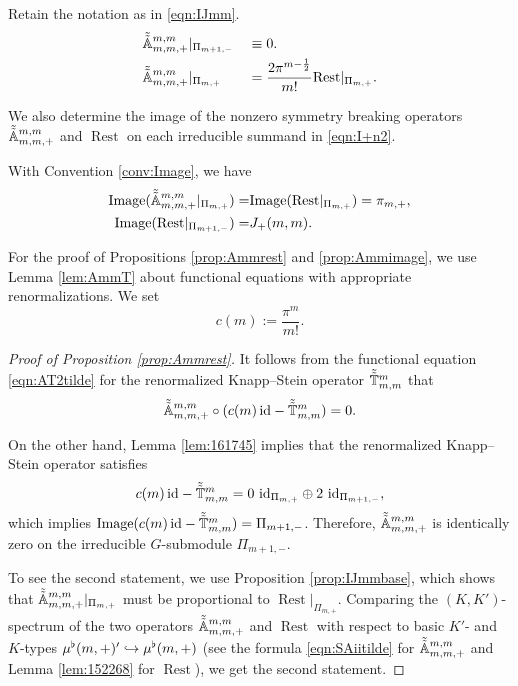 \begin{proposition}
\label{prop:Ammrest}
Retain the notation as in \eqref{eqn:IJmm}.  
\begin{alignat*}{2}
&\tilde{\tilde{{\mathbb{A}}}}_{{m},{m},{+}}^{{m, m}}
|_{\Pi_{m+1,-}}
&&
\equiv
0.  
\\
&\tilde{\tilde{{\mathbb{A}}}}_{{m},{m},{+}}^{{m, m}}
|_{\Pi_{m,+}}
&&=
\frac{2 \pi^{m-\frac{1}{2}}}{m!} {\operatorname{Rest}}|_{\Pi_{m,+}}.  
\end{alignat*}
\end{proposition}
We also determine
 the image of the nonzero symmetry breaking operators
 $\tilde{\tilde{{\mathbb{A}}}}_{{m},{m},{+}}^{{m,m}}$ and ${\operatorname{Rest}}$
 on each irreducible summand
in \eqref{eqn:I+n2}.  
\begin{proposition}
\label{prop:Ammimage}
With Convention \ref{conv:Image}, 
 we have 
\begin{align*}
{\operatorname{Image}}(\tilde{\tilde{{\mathbb{A}}}}_{{m},{m},{+}}^{{m, m}}
|_{\Pi_{m,+}})
=&
{\operatorname{Image}}
 ({\operatorname{Rest}}|_{\Pi_{m,+}})
=\pi_{m,+},   
\\
{\operatorname{Image}}
 ({\operatorname{Rest}}|_{\Pi_{m+1,-}})
=&
J_+(m, m).  
\end{align*}
\end{proposition}
For the proof of Propositions \ref{prop:Ammrest} and \ref{prop:Ammimage}, 
 we use Lemma \ref{lem:AmmT} about functional equations
 with appropriate renormalizations.  
We set 
\begin{equation}
\label{eqn:cm}
   c(m):=\frac{\pi^{m}}{m!}. 
\end{equation}
\begin{proof}
[Proof of Proposition \ref{prop:Ammrest}]
It follows from the functional equation \eqref{eqn:AT2tilde}
 for the 
renormalized Knapp--Stein operator
 $\tilde{\tilde{{\mathbb{T}}}}_{{m},{m}}^{{m}}$
 that 
\[
  \tilde{\tilde{{\mathbb{A}}}}_{{m},{m},{+}}^{{m, m}}
  \circ
  (c(m)\, {\operatorname{id}} - \tilde{\tilde{{\mathbb{T}}}}_{{m},{m}}^{{m}})=0.  
\]



On the other hand, 
 Lemma \ref{lem:161745} implies 
 that the renormalized Knapp--Stein operator satisfies 
\[
  c(m)\, {\operatorname{id}} - \tilde{\tilde{{\mathbb{T}}}}_{{m},{m}}^{{m}}
  =
  0\,\, {\operatorname{id}}_{\Pi_{m, +}} 
  \oplus
  2\,\, {\operatorname{id}}_{\Pi_{m+1, -}}, 
\]
which implies ${\operatorname{Image}}(c(m)\, {\operatorname{id}} - \tilde{\tilde{{\mathbb{T}}}}_{{m},{m}}^{{m}})=\Pi_{m+1, -}$.  
Therefore, 
 $\tilde{\tilde{{\mathbb{A}}}}_{{m},{m},{+}}^{{m, m}}$ is 
 identically zero
 on the irreducible $G$-submodule $\Pi_{m+1,-}$.  

To see the second statement,
 we use Proposition \ref{prop:IJmmbase}, 
 which shows that $\tilde{\tilde{{\mathbb{A}}}}_{{m},{m},{+}}^{{m, m}}|_{\Pi_{m, +}}$ must be 
 proportional to ${\operatorname{Rest}}|_{\Pi_{m,+}}$.  
Comparing the $(K,K')$-spectrum
 of the two operators $\tilde{\tilde{{\mathbb{A}}}}_{{m},{m},{+}}^{{m, m}}$
 and ${\operatorname{Rest}}$
 with respect to basic $K'$- and $K$-types
 $\mu^{\flat}(m, +)' \hookrightarrow \mu^{\flat}(m, +)$ 
 (see the formula \eqref{eqn:SAiitilde} for $\tilde{\tilde{{\mathbb{A}}}}_{{m},{m},{+}}^{{m,m}}$ and Lemma \ref{lem:152268}
 for ${\operatorname{Rest}}$), 
 we get the second statement.  
\end{proof}

